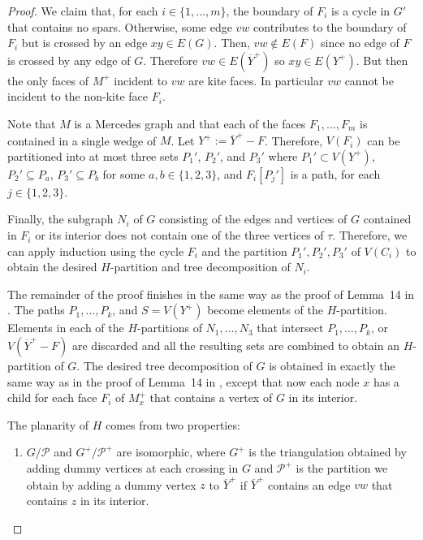 \documentclass{patmorin}
\begin{document}
\begin{proof}
  We claim that, for each $i\in\{1,\ldots,m\}$, the boundary of $F_i$ is a cycle in $G'$ that contains no spars. Otherwise, some edge $vw$ contributes to the boundary of $F_i$ but is crossed by an edge $xy\in E(G)$. Then, $vw\not\in E(F)$ since no edge of $F$ is crossed by any edge of $G$. Therefore $vw\in E(\overline{Y}^+)$ so $xy\in E(Y^+)$. But then the only faces of $M^+$ incident to $vw$ are kite faces.  In particular $vw$ cannot be incident to the non-kite face $F_i$.
  
  Note that $M$ is a Mercedes graph and that each of the faces $F_1,\ldots,F_m$ is contained in a single wedge of $M$.   Let $Y^+ := \overline{Y}^+-F$. Therefore, $V(F_i)$ can be partitioned into at most three sets $P_1'$, $P_2'$, and $P_3'$ where $P_1'\subset V(Y^+)$, $P_2'\subseteq P_a$, $P_3'\subseteq P_b$ for some $a,b\in\{1,2,3\}$, and $F_i[P_j']$ is a path, for each $j\in\{1,2,3\}$. 

  Finally, the subgraph $N_i$ of $G$ consisting of the edges and vertices of $G$ contained in $F_i$ or its interior does not contain one of the three vertices of $\tau$. Therefore, we can apply induction using the cycle $F_i$ and the partition $P_1',P_2',P_3'$ of $V(C_i)$ to obtain the desired $H$-partition and tree decomposition of $N_i$.
  
  The remainder of the proof finishes in the same way as the proof of Lemma~14 in \cite{dujmovic.joret.ea:planar}.  The paths $P_1,\ldots,P_k$, and $S=V(Y^+)$ become elements of the $H$-partition.  Elements in each of the $H$-partitions of $N_1,\ldots,N_3$ that intersect $P_1,\ldots,P_k$, or $V(\overline{Y}^+-F)$ are discarded and all the resulting sets are combined to obtain an $H$-partition of $G$.  The desired tree decomposition of $G$ is obtained in exactly the same way as in the proof of Lemma~14 in \cite{dujmovic.joret.ea:planar}, except that now each node $x$ has a child for each face $F_i$ of $M^+_x$ that contains a vertex of $G$ in its interior.
  
  The planarity of $H$ comes from two properties:
  \begin{enumerate}
    \item $G/\mathcal{P}$ and $G^+/\mathcal{P^+}$ are isomorphic, where $G^+$ is the triangulation obtained by adding dummy vertices at each crossing in $G$ and $\mathcal{P}^+$ is the partition we obtain by adding a dummy vertex $z$ to $\overline{Y}^+$ if $\overline{Y}^+$ contains an edge $vw$ that contains $z$ in its interior.  
    

\end{enumerate}
\end{proof}
\end{document}
